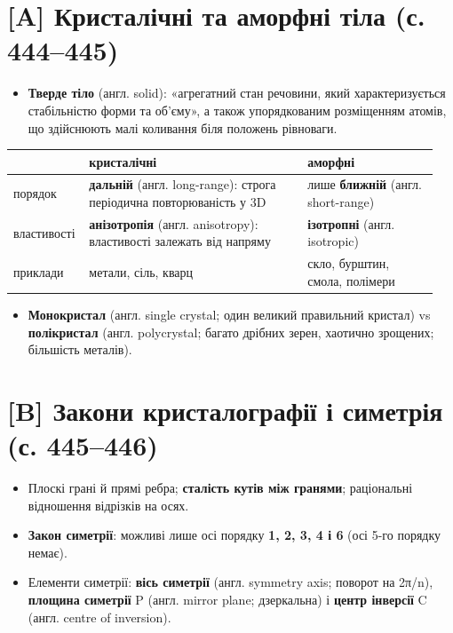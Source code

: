 \documentclass[11pt,a4paper,oneside]{book}
\begin{document}
\section*{[A] Кристалічні та аморфні тіла (с. 444–445)}
\begin{itemize}
\item \textbf{Тверде тіло} (англ. solid): «агрегатний стан речовини, який характеризується стабільністю форми та об'єму», а також упорядкованим розміщенням атомів, що здійснюють малі коливання біля положень рівноваги.
\end{itemize}
{\small
\begin{longtable}{>{\raggedright\arraybackslash}p{0.143\linewidth}>{\raggedright\arraybackslash}p{0.503\linewidth}>{\raggedright\arraybackslash}p{0.306\linewidth}}
\toprule
\textbf{} & \textbf{кристалічні} & \textbf{аморфні} \\
\midrule
\endhead
порядок & \textbf{дальній} (англ. long-range): строга періодична повторюваність у 3D & лише \textbf{ближній} (англ. short-range) \\
властивості & \textbf{анізотропія} (англ. anisotropy): властивості залежать від напряму & \textbf{ізотропні} (англ. isotropic) \\
приклади & метали, сіль, кварц & скло, бурштин, смола, полімери \\
\bottomrule
\end{longtable}
}
\begin{itemize}
\item \textbf{Монокристал} (англ. single crystal; один великий правильний кристал) vs \textbf{полікристал} (англ. polycrystal; багато дрібних зерен, хаотично зрощених; більшість металів).
\end{itemize}

\section*{[B] Закони кристалографії і симетрія (с. 445–446)}
\begin{itemize}
\item Плоскі грані й прямі ребра; \textbf{сталість кутів між гранями}; раціональні відношення відрізків на осях.
\item \textbf{Закон симетрії}: можливі лише осі порядку \textbf{1, 2, 3, 4 і 6} (осі 5-го порядку немає).
\item Елементи симетрії: \textbf{вісь симетрії} (англ. symmetry axis; поворот на 2π/n), \textbf{площина симетрії} P (англ. mirror plane; дзеркальна) і \textbf{центр інверсії} C (англ. centre of inversion).
\end{itemize}
\end{document}
